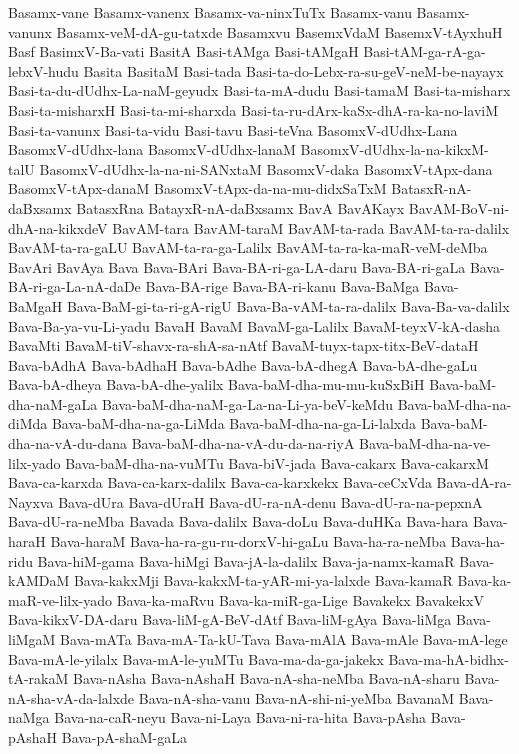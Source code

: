 {Basamx-vane
Basamx-vanenx
Basamx-va-ninxTuTx
Basamx-vanu
Basamx-vanunx
Basamx-veM-dA-gu-tatxde
Basamxvu
BasemxVdaM
BasemxV-tAyxhuH
Basf
BasimxV-Ba-vati
BasitA
Basi-tAMga
Basi-tAMgaH
Basi-tAM-ga-rA-ga-lebxV-hudu
Basita
BasitaM
Basi-tada
Basi-ta-do-Lebx-ra-su-geV-neM-be-nayayx
Basi-ta-du-dUdhx-La-naM-geyudx
Basi-ta-mA-dudu
Basi-tamaM
Basi-ta-misharx
Basi-ta-misharxH
Basi-ta-mi-sharxda
Basi-ta-ru-dArx-kaSx-dhA-ra-ka-no-laviM
Basi-ta-vanunx
Basi-ta-vidu
Basi-tavu
Basi-teVna
BasomxV-dUdhx-Lana
BasomxV-dUdhx-lana
BasomxV-dUdhx-lanaM
BasomxV-dUdhx-la-na-kikxM-talU
BasomxV-dUdhx-la-na-ni-SANxtaM
BasomxV-daka
BasomxV-tApx-dana
BasomxV-tApx-danaM
BasomxV-tApx-da-na-mu-didxSaTxM
BatasxR-nA-daBxsamx
BatasxRna
BatayxR-nA-daBxsamx
BavA
BavAKayx
BavAM-BoV-ni-dhA-na-kikxdeV
BavAM-tara
BavAM-taraM
BavAM-ta-rada
BavAM-ta-ra-dalilx
BavAM-ta-ra-gaLU
BavAM-ta-ra-ga-Lalilx
BavAM-ta-ra-ka-maR-veM-deMba
BavAri
BavAya
Bava
Bava-BAri
Bava-BA-ri-ga-LA-daru
Bava-BA-ri-gaLa
Bava-BA-ri-ga-La-nA-daDe
Bava-BA-rige
Bava-BA-ri-kanu
Bava-BaMga
Bava-BaMgaH
Bava-BaM-gi-ta-ri-gA-rigU
Bava-Ba-vAM-ta-ra-dalilx
Bava-Ba-va-dalilx
Bava-Ba-ya-vu-Li-yadu
BavaH
BavaM
BavaM-ga-Lalilx
BavaM-teyxV-kA-dasha
BavaMti
BavaM-tiV-shavx-ra-shA-sa-nAtf
BavaM-tuyx-tapx-titx-BeV-dataH
Bava-bAdhA
Bava-bAdhaH
Bava-bAdhe
Bava-bA-dhegA
Bava-bA-dhe-gaLu
Bava-bA-dheya
Bava-bA-dhe-yalilx
Bava-baM-dha-mu-mu-kuSxBiH
Bava-baM-dha-naM-gaLa
Bava-baM-dha-naM-ga-La-na-Li-ya-beV-keMdu
Bava-baM-dha-na-diMda
Bava-baM-dha-na-ga-LiMda
Bava-baM-dha-na-ga-Li-lalxda
Bava-baM-dha-na-vA-du-dana
Bava-baM-dha-na-vA-du-da-na-riyA
Bava-baM-dha-na-ve-lilx-yado
Bava-baM-dha-na-vuMTu
Bava-biV-jada
Bava-cakarx
Bava-cakarxM
Bava-ca-karxda
Bava-ca-karx-dalilx
Bava-ca-karxkekx
Bava-ceCxVda
Bava-dA-ra-Nayxva
Bava-dUra
Bava-dUraH
Bava-dU-ra-nA-denu
Bava-dU-ra-na-pepxnA
Bava-dU-ra-neMba
Bavada
Bava-dalilx
Bava-doLu
Bava-duHKa
Bava-hara
Bava-haraH
Bava-haraM
Bava-ha-ra-gu-ru-dorxV-hi-gaLu
Bava-ha-ra-neMba
Bava-ha-ridu
Bava-hiM-gama
Bava-hiMgi
Bava-jA-la-dalilx
Bava-ja-namx-kamaR
Bava-kAMDaM
Bava-kakxMji
Bava-kakxM-ta-yAR-mi-ya-lalxde
Bava-kamaR
Bava-ka-maR-ve-lilx-yado
Bava-ka-maRvu
Bava-ka-miR-ga-Lige
Bavakekx
BavakekxV
Bava-kikxV-DA-daru
Bava-liM-gA-BeV-dAtf
Bava-liM-gAya
Bava-liMga
Bava-liMgaM
Bava-mATa
Bava-mA-Ta-kU-Tava
Bava-mAlA
Bava-mAle
Bava-mA-lege
Bava-mA-le-yilalx
Bava-mA-le-yuMTu
Bava-ma-da-ga-jakekx
Bava-ma-hA-bidhx-tA-rakaM
Bava-nAsha
Bava-nAshaH
Bava-nA-sha-neMba
Bava-nA-sharu
Bava-nA-sha-vA-da-lalxde
Bava-nA-sha-vanu
Bava-nA-shi-ni-yeMba
BavanaM
Bava-naMga
Bava-na-caR-neyu
Bava-ni-Laya
Bava-ni-ra-hita
Bava-pAsha
Bava-pAshaH
Bava-pA-shaM-gaLa
}
